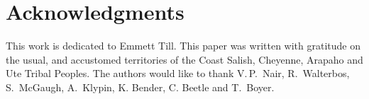 \documentclass[reprint,%
 amsmath,amssymb,
 aps,
]{revtex4-1}
\begin{document}


   

  \section[]{Acknowledgments}
 This work is dedicated to Emmett Till. This paper was written with gratitude on the usual, and accustomed  territories
of the Coast Salish, Cheyenne, Arapaho and Ute Tribal Peoples.
  The authors would like to thank  V.\,P.\,  Nair,   R.\, Walterbos, S.\ McGaugh, A.\, Klypin, K. Bender, C. Beetle and     T.\, Boyer.   \\
  
 
\end{document}
